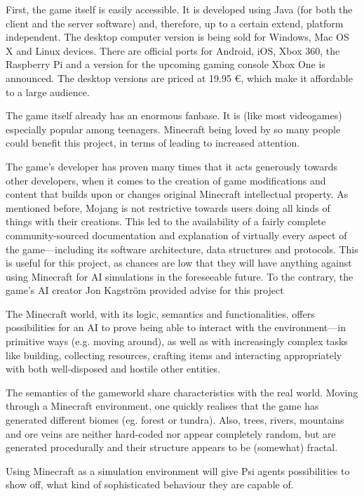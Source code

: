 First, the game itself is easily accessible. It is developed using Java (for both the client and the server software) and, therefore, up to a certain extend, platform independent. The desktop computer version is being sold for Windows, Mac OS X and Linux devices. There are official ports for Android, iOS, Xbox 360, the Raspberry Pi and a version for the upcoming gaming console Xbox One is announced. The desktop versions are priced at 19.95 \euro, which make it affordable to a large audience.

The game itself already has an enormous fanbase. It is (like most videogames) especially popular among teenagers. Minecraft being loved by so many people could benefit this project, in terms of leading to increased attention.

The game's developer has proven many times that it acts generously towards  other developers, when it comes to the creation of game modifications and content that builds upon or changes original Minecraft intellectual property. As mentioned before, Mojang is not restrictive towards users doing all kinds of things with their creations. This led to the availability of a fairly complete community-sourced  documentation and explanation of virtually every aspect of the game---including its software architecture, data structures and protocols. This is useful for this project, as chances are low that they will have anything against using Minecraft for AI simulations in the foreseeable future. To the contrary, the game's AI creator Jon Kagström provided advise for this project

The Minecraft world, with its logic, semantics and functionalities, offers possibilities for an AI to prove being able to interact with the environment---in primitive ways (e.g. moving around), as well as with increasingly complex tasks like building, collecting resources, crafting items and interacting appropriately with both well-disposed and hostile other entities.

The semantics of the gameworld share characteristics with the real world. Moving through a Minecraft environment, one quickly realises that the game has generated different biomes (eg. forest or tundra). Also, trees, rivers, mountains and ore veins are neither hard-coded nor appear completely random, but are generated procedurally and their structure appears to be (somewhat) fractal.
        
Using Minecraft as a simulation environment will give Psi agents possibilities to show off, what kind of sophisticated behaviour they are capable of.

